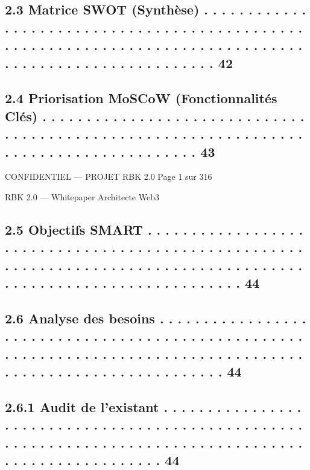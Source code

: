 \subsection{2.3     Matrice SWOT (Synthèse) . . . . . . . . . . . . . . . . . . . . . . . . . . . . . . . . . . . . . . . . . . . . . . . . . . . . . . . . . . . . . . . . . . . . . . . . . . . . . . . . . . . . . . . . . . . . . . . . . . . . . . . . 42}
\subsection{2.4     Priorisation MoSCoW (Fonctionnalités Clés) . . . . . . . . . . . . . . . . . . . . . . . . . . . . . . . . . . . . . . . . . . . . . . . . . . . . . . . . . . . . . . . . . . . . . . . . . . . . . . . . . . . . . . 43}
\vspace{0.5em}
\vspace{0.5em}
\vspace{0.5em}
\vspace{0.5em}
\begin{confidential}CONFIDENTIEL — PROJET RBK 2.0                                                                              Page 1 sur 316\end{confidential}
RBK 2.0 — Whitepaper Architecte Web3\\
\vspace{0.5em}
\vspace{0.5em}
\subsection{2.5     Objectifs SMART . . . . . . . . . . . . . . . . . . . . . . . . . . . . . . . . . . . . . . . . . . . . . . . . . . . . . . . . . . . . . . . . . . . . . . . . . . . . . . . . . . . . . . . . . . . . . . . . . . . . . . . . . . . . . . . . . 44}
\subsection{2.6     Analyse des besoins . . . . . . . . . . . . . . . . . . . . . . . . . . . . . . . . . . . . . . . . . . . . . . . . . . . . . . . . . . . . . . . . . . . . . . . . . . . . . . . . . . . . . . . . . . . . . . . . . . . . . . . . . . . . . . 44}
\subsection{2.6.1               Audit de l’existant . . . . . . . . . . . . . . . . . . . . . . . . . . . . . . . . . . . . . . . . . . . . . . . . . . . . . . . . . . . . . . . . . . . . . . . . . . . . . . . . . . . . . . . . . . . . . . . . . . . . . . 44}
